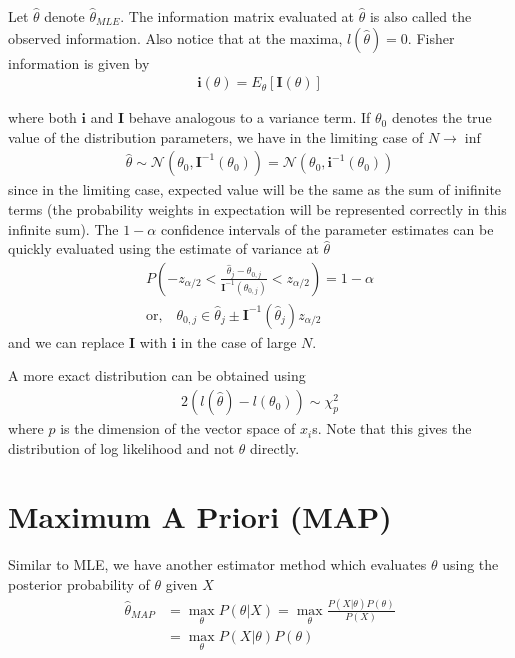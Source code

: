 \documentclass[../statistical_learning_notes.tex]{subfiles}
\begin{document}
Let $\hat{\theta}$ denote $\hat{\theta}_{MLE}$. The information matrix evaluated at $\hat{\theta}$ is also called the observed information. Also notice that at the maxima, $l(\hat{\theta}) = 0$. Fisher information is given by
\begin{align*}
    \mathbf{i}(\theta) = E_{\theta}[\mathbf{I}(\theta)]
\end{align*}

where both $\mathbf{i}$ and $\mathbf{I}$ behave analogous to a variance term. If $\theta_{0}$ denotes the true value of the distribution parameters, we have in the limiting case of $N \rightarrow \inf$
\begin{align*}
    \hat{\theta} \sim \mathcal{N}(\theta_{0}, \mathbf{I}^{-1}(\theta_{0})) = \mathcal{N}(\theta_{0}, \mathbf{i}^{-1}(\theta_{0}))
\end{align*}
since in the limiting case, expected value will be the same as the sum of inifinite terms (the probability weights in expectation will be represented correctly in this infinite sum).\newline
The $1-\alpha$ confidence intervals of the parameter estimates can be quickly evaluated using the estimate of variance at $\hat{\theta}$
\begin{gather*}
    P(-z_{\alpha/2} < \frac{\hat{\theta}_{j} - \theta_{0,j}}{\mathbf{I}^{-1}(\theta_{0,j})} < z_{\alpha/2}) = 1 - \alpha\\
    \text{or,} \quad \theta_{0,j} \in \hat{\theta}_{j} \pm \mathbf{I}^{-1}(\hat{\theta}_{j})z_{\alpha/2}
\end{gather*}
and we can replace $\mathbf{I}$ with $\mathbf{i}$ in the case of large $N$.\newline

A more exact distribution can be obtained using
\begin{align*}
    2(l(\hat{\theta}) - l(\theta_{0})) \sim \chi^{2}_{p}
\end{align*}
where $p$ is the dimension of the vector space of $x_{i}$s. Note that this gives the distribution of log likelihood and not $\theta$ directly.


\section{Maximum A Priori (MAP)}
Similar to MLE, we have another estimator method which evaluates $\theta$ using the posterior probability of $\theta$ given $X$
\begin{align*}
    \hat{\theta}_{MAP} &= \max_{\theta} P(\theta|X) = \max_{\theta} \frac{P(X|\theta)P(\theta)}{P(X)}\\
    &= \max_{\theta}P(X|\theta)P(\theta)
\end{align*}
\end{document}
